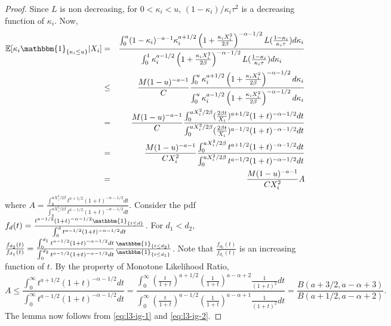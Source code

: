\documentclass[sn-basic]{sn-jnl}%
\theoremstyle{thmstyleone}%
\begin{document}
\begin{proof}
Since $L$ is non decreasing, for $0<\kappa_i<u$, $(1-\kappa_i)/\kappa_i\tau^2$ is a decreasing function of $\kappa_i$. Now,
\begin{eqnarray}
\mathbb{E}[\kappa_i \mathbbm{1}_{\{ \kappa_i \leq u \}} | X_i]
&=&
\frac{\int_0^u (1-\kappa_i)^{-a-1} \kappa_i^{a+1/2} \left( 1+\frac{\kappa_iX_i^2}{2\beta} \right)^{-\alpha-1/2} L(\frac{1-\kappa_i}{\kappa_i\tau}) d\kappa_i}{\int_0^1 \kappa_i^{a-1/2} \left( 1+\frac{\kappa_iX_i^2}{2\beta} \right)^{-\alpha-1/2} L(\frac{1-\kappa_i}{\kappa_i\tau}) d\kappa_i} \nonumber \\
&\leq&
\frac{M(1-u)^{-a-1}}{C} \frac{\int_0^u \kappa_i^{a+1/2} \left( 1+\frac{\kappa_iX_i^2}{2\beta} \right)^{-\alpha-1/2} d\kappa_i}{\int_0^u \kappa_i^{a-1/2} \left( 1+\frac{\kappa_iX_i^2}{2\beta} \right)^{-\alpha-1/2} d\kappa_i} \nonumber \\
&=&
\frac{M(1-u)^{-a-1}}{C} \frac{\int_0^{uX_i^2/2\beta} (\frac{2\beta t}{X_i})^{a+1/2} (1+t)^{-\alpha-1/2} dt}{\int_0^{uX_i^2/2\beta} (\frac{2\beta t}{X_i})^{a-1/2} (1+t)^{-\alpha-1/2} dt} \nonumber \\
&=&
\frac{M(1-u)^{-a-1}}{C X_i^2} \frac{\int_0^{uX_i^2/2\beta} t^{a+1/2} (1+t)^{-\alpha-1/2} dt}{\int_0^{uX_i^2/2\beta} t^{a-1/2} (1+t)^{-\alpha-1/2} dt} \nonumber \\
&=&
\frac{M(1-u)^{-a-1}}{C X_i^2} A
\label{eq:l3-ig-1}
\end{eqnarray}
\noindent
where $A = \frac{\int_0^{uX_i^2/2\beta} t^{a+1/2} (1+t)^{-\alpha-1/2} dt}{\int_0^{uX_i^2/2\beta} t^{a-1/2} (1+t)^{-\alpha-1/2} dt}$. Consider the pdf $f_d(t) = \frac{t^{a-1/2} (1+t)^{-\alpha-1/2} \mathbbm{1}_{\{ t \leq d \}}}{\int_0^d t^{a-1/2} (1+t)^{-\alpha-1/2} dt}$.
\noindent
For $d_1<d_2$, $\frac{f_{d_2}(t)}{f_{d_1}(t)} = \frac{\int_0^{d_1} t^{a-1/2} (1+t)^{-\alpha-1/2} dt}{\int_0^{d_2} t^{a-1/2} (1+t)^{-\alpha-1/2} dt} \frac{\mathbbm{1}_{\{ t \leq d_2 \}}}{\mathbbm{1}_{\{ t \leq d_1 \}}}$. Note that $\frac{f_{d_2}(t)}{f_{d_1}(t)}$ is an increasing function of $t$. By the property of Monotone Likelihood Ratio,
\begin{equation}
A \leq \frac{\int_0^\infty t^{a+1/2} (1+t)^{-\alpha-1/2} dt}{\int_0^\infty t^{a-1/2} (1+t)^{-\alpha-1/2} dt} = \frac{\int_0^\infty (\frac{t}{1+t})^{a+1/2} (\frac{1}{1+t})^{a-\alpha+2} \frac{1}{(1+t)^2}dt}{\int_0^\infty (\frac{t}{1+t})^{a-1/2} (\frac{1}{1+t})^{a-\alpha+1} \frac{1}{(1+t)^2}dt} = \frac{B(a+3/2, a-\alpha+3)}{B(a+1/2, a-\alpha+2)}.
\label{eq:l3-ig-2}
\end{equation}
\noindent
The lemma now follows from \eqref{eq:l3-ig-1} and \eqref{eq:l3-ig-2}.
\end{proof}
\end{document}
